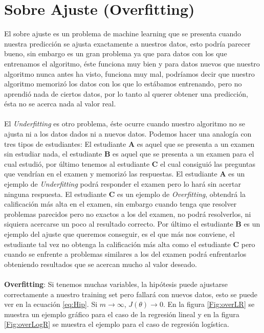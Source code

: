\documentclass{report}
\begin{document}
\section{Sobre Ajuste (Overfitting)}
	El sobre ajuste es un problema de machine learning que se presenta cuando nuestra predicción se ajusta exactamente a nuestros datos, esto podría parecer bueno, sin embargo es un gran problema ya que para datos con los que entrenamos el algoritmo, éste funciona muy bien y para datos nuevos que nuestro algoritmo nunca antes ha visto, funciona muy mal, podríamos decir que nuestro algoritmo memorizó los datos con los que lo estábamos entrenando, pero no aprendió nada de ciertos datos, por lo tanto al querer obtener una predicción, ésta no se acerca nada al valor real.\\\\El \textit{Underfitting} es otro problema, éste ocurre cuando nuestro algoritmo no se ajusta ni a los datos dados ni a nuevos datos. Podemos hacer una analogía con tres tipos de estudiantes: El estudiante \textbf{A} es aquel que se presenta a un examen sin estudiar nada, el estudiante \textbf{B} es aquel que se presenta a un examen para el cual estudió, por último tenemos al estudiante \textbf{C} el cual consiguió las preguntas que vendrían en el examen y memorizó las respuestas. El estudiante \textbf{A} es un ejemplo de \textit{Underfitting} podrá responder el examen pero lo hará sin acertar ninguna respuesta. El estudiante \textbf{C} es un ejemplo de \textit{Overfitting}, obtendrá la calificación más alta en el examen, sin embargo cuando tenga que resolver problemas parecidos pero no exactos a los del examen, no podrá resolverlos, ni siquiera acercarse un poco al resultado correcto. Por último el estudiante \textbf{B} es un ejemplo del ajuste que queremos conseguir, es el que más nos conviene, el estudiante tal vez no obtenga la calificación más alta como el estudiante \textbf{C} pero cuando se enfrente a problemas similares a los del examen podrá enfrentarlos obteniendo resultados que se acercan mucho al valor deseado.\\\\\textbf{Overfitting}: Si tenemos muchas variables, la hipótesis puede ajustarse correctamente a nuestro training set pero fallará con nuevos datos, esto se puede ver en la ecuación \ref{eq:Hip}. Si $ m\rightarrow\infty $, $ J(\theta)\rightarrow0 $. En la figura \ref{Fig:overLR} se muestra un ejemplo gráfico para el caso de la regresión lineal y en la figura \ref{Fig:overLogR} se muestra el ejemplo para el caso de regresión logística.
\end{document}
